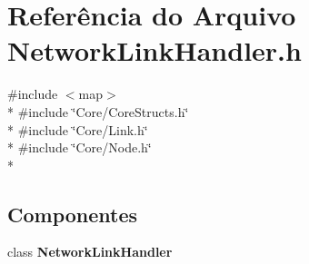 \section{Referência do Arquivo Network\+Link\+Handler.\+h}
\label{_network_link_handler_8h}
{\ttfamily \#include $<$map$>$}\\*
{\ttfamily \#include \char`\"{}Core/\+Core\+Structs.\+h\char`\"{}}\\*
{\ttfamily \#include \char`\"{}Core/\+Link.\+h\char`\"{}}\\*
{\ttfamily \#include \char`\"{}Core/\+Node.\+h\char`\"{}}\\*
\subsection*{Componentes}
\begin{DoxyCompactItemize}
\item 
class {\bf Network\+Link\+Handler}
\end{DoxyCompactItemize}
